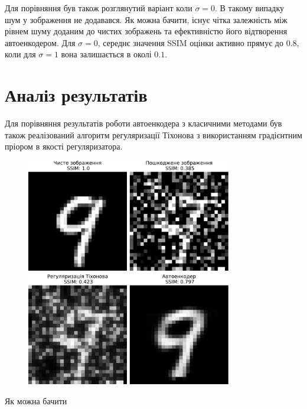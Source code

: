 \documentclass[14pt,a4paper]{extarticle}
\newcounter{e}
\numberwithin{equation}{section}
\numberwithin{figure}{section}
\begin{document}
	Для порівняння був також розглянутий варіант коли $\sigma = 0$. В такому випадку шум у зображення не додавався. Як можна бачити, існує чітка залежність між рівнем шуму доданим до чистих зображень та ефективністю його відтворення автоенкодером. Для $\sigma = 0$, середнє значення SSIM оцінки активно прямує до 0.8, коли для $\sigma = 1$ вона залишається в околі $0.1$.

		
	\newpage
	\thispagestyle{empty}
	\section{Аналіз результатів}

	Для порівняння результатів роботи автоенкодера з класичними методами був також реалізований алгоритм регуляризації Тіхонова з використанням градієнтним пріором в якості регуляризатора.
	
	\begin{figure}[H]
		\centering
		\includegraphics[width=0.8\textwidth]{resources/denoising-methods-comparation.pdf}
		\caption{}
		\label{fig:denoising-methods-comparation}
	\end{figure}
	
	Як можна бачити 
	
\end{document}
